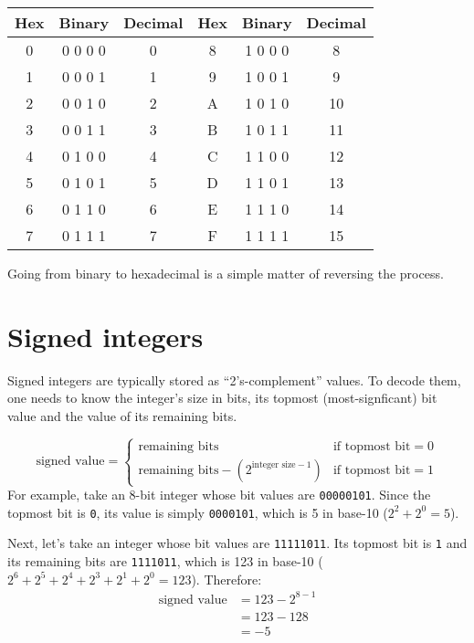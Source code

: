 
\begin{tabular}{| c | c | c || c | c | c |}
\hline
Hex & Binary & Decimal & Hex & Binary & Decimal \\
\hline
0 & 0 0 0 0  & 0 & 8 &  1 0 0 0  & 8 \\
1 & 0 0 0 1 & 1 & 9 & 1 0 0 1 & 9 \\
2 & 0 0 1 0 & 2 & A & 1 0 1 0 & 10 \\
3 & 0 0 1 1 & 3 & B & 1 0 1 1 & 11 \\
4 & 0 1 0 0 & 4 & C & 1 1 0 0 & 12 \\
5 & 0 1 0 1 & 5 & D & 1 1 0 1 & 13 \\
6 & 0 1 1 0 & 6 & E & 1 1 1 0 & 14 \\
7 & 0 1 1 1 & 7 & F & 1 1 1 1 & 15 \\
\hline
\end{tabular}
\begin{flushleft}
Going from binary to hexadecimal is a simple matter of reversing
the process.
\end{flushleft}

\section{Signed integers}
Signed integers are typically stored as ``2's-complement'' values.
To decode them, one needs to know the integer's size in bits, its
topmost (most-signficant) bit value and the value of its remaining bits.

\begin{equation}
\text{signed value} =
\begin{cases}
\text{remaining bits} & \text{if topmost bit} = 0 \\
\text{remaining bits} - (2 ^ {\text{integer size} - 1}) & \text{if topmost bit} = 1
\end{cases}
\end{equation}
For example, take an 8-bit integer whose bit values are \texttt{00000101}.
Since the topmost bit is \texttt{0}, its value is simply \texttt{0000101},
which is 5 in base-10 ($2 ^ 2 + 2 ^ 0 = 5$).

Next, let's take an integer whose bit values are \texttt{11111011}.
Its topmost bit is \texttt{1} and its remaining bits are \texttt{1111011},
which is 123 in base-10
($2 ^ 6 + 2 ^ 5 + 2 ^ 4 + 2 ^ 3 + 2 ^ 1 + 2 ^ 0 = 123$).
Therefore:
\begin{align*}
\text{signed value} &= 123 - 2 ^ {8 - 1} \\
 &= 123 - 128 \\
 &= -5
\end{align*}

